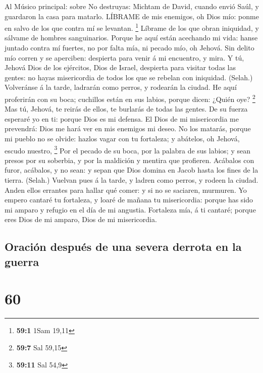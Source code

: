  Al Músico principal: sobre No destruyas: Michtam de David,
cuando envió Saúl, y guardaron la casa para matarlo. LÍBRAME de mis
enemigos, oh Dios mío: ponme en salvo de los que contra mí se levantan.
\footnote{\textbf{59:1} 1Sam 19,11}  Líbrame de los que
obran iniquidad, y sálvame de hombres sanguinarios.  Porque
he aquí están acechando mi vida: hanse juntado contra mí fuertes, no por
falta mía, ni pecado mío, oh Jehová.  Sin delito mío corren
y se aperciben: despierta para venir á mi encuentro, y mira.
 Y tú, Jehová Dios de los ejércitos, Dios de Israel,
despierta para visitar todas las gentes: no hayas misericordia de todos
los que se rebelan con iniquidad. (Selah.)  Volveránse á la
tarde, ladrarán como perros, y rodearán la ciudad.  He aquí
proferirán con su boca; cuchillos están en sus labios, porque dicen:
¿Quién oye? \footnote{\textbf{59:7} Sal 59,15}  Mas tú,
Jehová, te reirás de ellos, te burlarás de todas las gentes.
 De su fuerza esperaré yo en ti: porque Dios es mi defensa.
 El Dios de mi misericordia me prevendrá: Dios me hará ver
en mis enemigos mi deseo.  No los matarás, porque mi pueblo
no se olvide: hazlos vagar con tu fortaleza; y abátelos, oh Jehová,
escudo nuestro, \footnote{\textbf{59:11} Sal 54,9}  Por el
pecado de su boca, por la palabra de sus labios; y sean presos por su
soberbia, y por la maldición y mentira que profieren. 
Acábalos con furor, acábalos, y no sean: y sepan que Dios domina en
Jacob hasta los fines de la tierra. (Selah.)  Vuelvan pues
á la tarde, y ladren como perros, y rodeen la ciudad. 
Anden ellos errantes para hallar qué comer: y si no se saciaren,
murmuren.  Yo empero cantaré tu fortaleza, y loaré de
mañana tu misericordia: porque has sido mi amparo y refugio en el día de
mi angustia.  Fortaleza mía, á ti cantaré; porque eres Dios
de mi amparo, Dios de mi misericordia.

\hypertarget{oraciuxf3n-despuuxe9s-de-una-severa-derrota-en-la-guerra}{%
\subsection{Oración después de una severa derrota en la
guerra}\label{oraciuxf3n-despuuxe9s-de-una-severa-derrota-en-la-guerra}}

\hypertarget{section-59}{%
\section{60}\label{section-59}}

